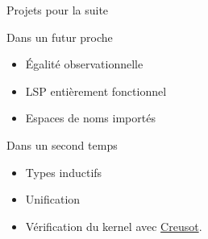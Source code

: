 \documentclass[12pt, aspectratio=169]{beamer}
\begin{document}
        \begin{frame}{Projets pour la suite}

            \begin{block}{Dans un futur proche}

                \begin{itemize}
                    \item Égalité observationnelle \pause
                    \item LSP entièrement fonctionnel \pause
                    \item Espaces de noms importés
                \end{itemize}

            \end{block}

            \vfill
            \pause

            \begin{block}{Dans un second temps}

                \begin{itemize}
                    \item Types inductifs \pause
                    \item Unification
                    \item Vérification du kernel avec \href{https://github.com/xldenis/creusot}{Creusot}.
                \end{itemize}

            \end{block}

        \end{frame}
\end{document}
